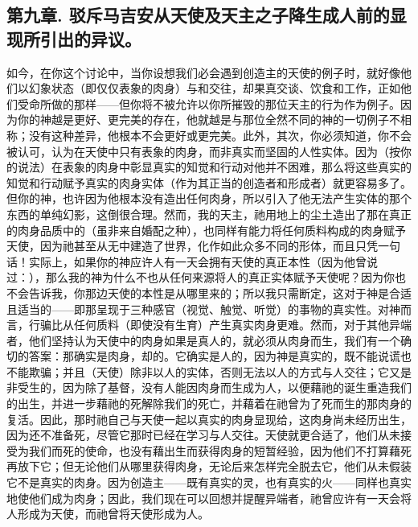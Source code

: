 
\subsection{第九章. 驳斥马吉安从天使及天主之子降生成人前的显现所引出的异议。}

如今，在你这个讨论中，当你设想我们必会遇到创造主的天使的例子时，就好像他们以幻象状态（即仅仅表象的肉身）与和交往，却果真交谈、饮食和工作，正如他们受命所做的那样——但你将不被允许以你所摧毁的那位天主的行为作为例子。因为你的神越是更好、更完美的存在，他就越是与那位全然不同的神的一切例子不相称；没有这种差异，他根本不会更好或更完美。此外，其次，你必须知道，你不会被认可，认为在天使中只有表象的肉身，而非真实而坚固的人性实体。因为（按你的说法）在表象的肉身中彰显真实的知觉和行动对他并不困难，那么将这些真实的知觉和行动赋予真实的肉身实体（作为其正当的创造者和形成者）就更容易多了。但你的神，也许因为他根本没有造出任何肉身，所以引入了他无法产生实体的那个东西的单纯幻影，这倒很合理。然而，我的天主，祂用地上的尘土造出了那在真正的肉身品质中的（虽非来自婚配之种），也同样有能力将任何质料构成的肉身赋予天使，因为祂甚至从无中建造了世界，化作如此众多不同的形体，而且只凭一句话！实际上，如果你的神应许人有一天会拥有天使的真正本性（因为他曾说过：），那么我的神为什么不也从任何来源将人的真正实体赋予天使呢？因为你也不会告诉我，你那边天使的本性是从哪里来的；所以我只需断定，这对于神是合适且适当的——即那呈现于三种感官（视觉、触觉、听觉）的事物的真实性。对神而言，行骗比从任何质料（即使没有生育）产生真实肉身更难。然而，对于其他异端者，他们坚持认为天使中的肉身如果是真人的，就必须从肉身而生，我们有一个确切的答案：那确实是肉身，却的。它确实是人的，因为神是真实的，既不能说谎也不能欺骗；并且（天使）除非以人的实体，否则无法以人的方式与人交往；它又是非受生的，因为除了基督，没有人能因肉身而生成为人，以便藉祂的诞生重造我们的出生，并进一步藉祂的死解除我们的死亡，并藉着在祂曾为了死而生的那肉身的复活。因此，那时祂自己与天使一起以真实的肉身显现给，这肉身尚未经历出生，因为还不准备死，尽管它那时已经在学习与人交往。天使就更合适了，他们从未接受为我们而死的使命，也没有藉出生而获得肉身的短暂经验，因为他们不打算藉死再放下它；但无论他们从哪里获得肉身，无论后来怎样完全脱去它，他们从未假装它不是真实的肉身。因为创造主——既有真实的灵，也有真实的火——同样也真实地使他们成为肉身；因此，我们现在可以回想并提醒异端者，祂曾应许有一天会将人形成为天使，而祂曾将天使形成为人。\par

